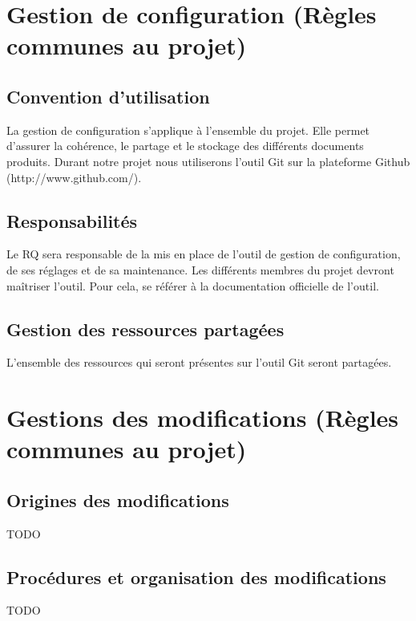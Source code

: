 \section{Gestion de configuration (Règles communes au projet)}
  \subsection{Convention d’utilisation}
   La gestion de configuration s'applique à l'ensemble du projet. Elle permet d'assurer la cohérence, le partage et le stockage des différents documents produits.
Durant notre projet nous utiliserons l'outil Git sur la plateforme Github (http://www.github.com/).

  \subsection{Responsabilités}
    Le RQ sera responsable de la mis en place de l'outil de gestion de configuration, de ses réglages et de sa maintenance.
    Les différents membres du projet devront maîtriser l'outil. Pour cela, se référer à la documentation officielle de l'outil.
  \subsection{Gestion des ressources partagées}
  L'ensemble des ressources qui seront présentes sur l'outil Git seront partagées.
  
\section{Gestions des modifications  (Règles communes au projet)}
  \subsection{Origines des modifications}
  \begin{center} \begin{Large}TODO\end{Large}  \end{center}
  \subsection{Procédures et organisation des modifications}
  \begin{center} \begin{Large}TODO\end{Large}  \end{center}


